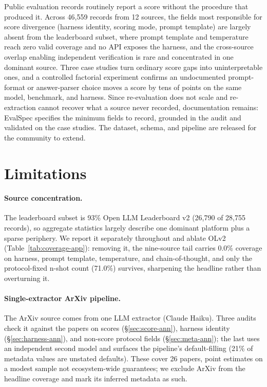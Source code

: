 \documentclass[11pt]{article}
\begin{document}
Public evaluation records routinely report a score without the procedure that
produced it. Across 46{,}559 records from 12 sources, the fields most responsible
for score divergence (harness identity, scoring mode, prompt template) are largely
absent from the leaderboard subset, where prompt template and temperature reach
zero valid coverage and no API exposes the harness, and the cross-source overlap
enabling independent verification is rare and concentrated in one dominant source.
Three case studies turn ordinary score gaps into uninterpretable ones, and a
controlled factorial experiment confirms an undocumented prompt-format or
answer-parser choice moves a score by tens of points on the same model,
benchmark, and harness. Since re-evaluation does not scale and re-extraction cannot
recover what a source never recorded, documentation remains: EvalSpec specifies the
minimum fields to record, grounded in the audit and validated on the case studies.
The dataset, schema, and pipeline are released for the community to extend.

\section*{Limitations}

\paragraph{Source concentration.} The leaderboard subset is 93\% Open LLM
Leaderboard v2 (26{,}790 of 28{,}755 records), so aggregate statistics largely
describe one dominant platform plus a sparse periphery. We report it separately
throughout and ablate OLv2 (Table~\ref{tab:coverage-app}): removing it, the
nine-source tail carries 0.0\% coverage on harness, prompt template, temperature,
and chain-of-thought, and only the protocol-fixed n-shot count (71.0\%) survives,
sharpening the headline rather than overturning it.

\paragraph{Single-extractor ArXiv pipeline.} The ArXiv source comes from one LLM
extractor (Claude Haiku). Three audits check it against the papers on scores
(\S\ref{sec:score-ann}), harness identity (\S\ref{sec:harness-ann}), and non-score
protocol fields (\S\ref{sec:meta-ann}); the last uses an independent second model
and surfaces the pipeline's default-filling (21\% of metadata values are unstated
defaults). These cover 26 papers, point estimates on a modest sample not
ecosystem-wide guarantees; we exclude ArXiv from the headline coverage and mark its
inferred metadata as such.
\end{document}
